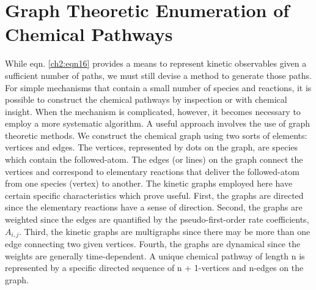 \section{Graph Theoretic Enumeration of Chemical Pathways}
\label{ch2:sec:theo_enu_path}
While eqn. \ref{ch2:eqn16} provides a means to represent kinetic observables given a sufficient
number of paths, we must still devise a method to generate those paths. For simple
mechanisms that contain a small number of species and reactions, it is possible to
construct the chemical pathways by inspection or with chemical insight. When the
mechanism is complicated, however, it becomes necessary to employ a more systematic
algorithm. A useful approach involves the use of graph theoretic methods.\cite{ch1_IRPC_29_balaban1976chemical} We
construct the chemical graph using two sorts of elements: vertices and edges. The vertices,
represented by dots on the graph, are species which contain the followed-atom.
The edges (or lines) on the graph connect the vertices and correspond to elementary
reactions that deliver the followed-atom from one species (vertex) to another. The
kinetic graphs employed here have certain specific characteristics which prove useful.
First, the graphs are directed since the elementary reactions have a sense of direction.
Second, the graphs are weighted since the edges are quantified by the pseudo-first-order
rate coefficients, $A_{i,j}$. Third, the kinetic graphs are multigraphs since there may be more
than one edge connecting two given vertices. Fourth, the graphs are dynamical since
the weights are generally time-dependent. A unique chemical pathway of length n is
represented by a specific directed sequence of n + 1-vertices and n-edges on the graph.
\newline
